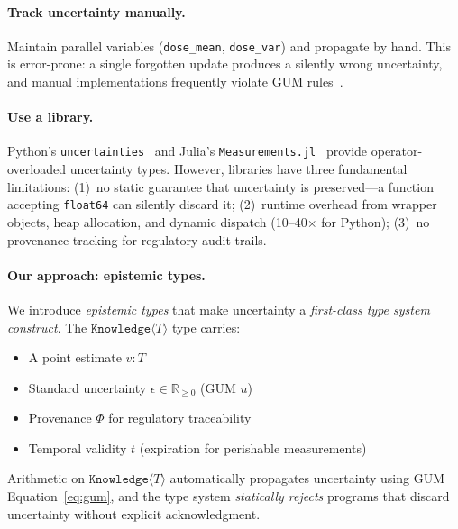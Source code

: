 \documentclass[acmsmall,screen,review,anonymous]{acmart}
\newcommand{\know}[1]{\texttt{Knowledge}\langle #1 \rangle}
\begin{document}
\paragraph{Track uncertainty manually.}
Maintain parallel variables (\texttt{dose\_mean}, \texttt{dose\_var})
and propagate by hand.
This is error-prone: a single forgotten update produces a silently
wrong uncertainty, and manual implementations frequently violate
GUM rules~\cite{jcgm2008supplement1}.

\paragraph{Use a library.}
Python's \texttt{uncertainties}~\cite{lebigot2024uncertainties} and
Julia's \texttt{Measurements.jl}~\cite{giordano2016measurements} provide
operator-overloaded uncertainty types.
However, libraries have three fundamental limitations:
(1)~no static guarantee that uncertainty is preserved---a function
accepting \texttt{float64} can silently discard it;
(2)~runtime overhead from wrapper objects, heap allocation, and
dynamic dispatch (10--40$\times$ for Python);
(3)~no provenance tracking for regulatory audit trails.

\paragraph{Our approach: epistemic types.}
We introduce \emph{epistemic types} that make uncertainty a
\emph{first-class type system construct}.
The $\know{T}$ type carries:
\begin{itemize}
  \item A point estimate $v : T$
  \item Standard uncertainty $\epsilon \in \mathbb{R}_{\geq 0}$ (GUM $u$)
  \item Provenance $\Phi$ for regulatory traceability
  \item Temporal validity $t$ (expiration for perishable measurements)
\end{itemize}

Arithmetic on $\know{T}$ automatically propagates uncertainty
using GUM Equation~\eqref{eq:gum}, and the type system \emph{statically
rejects} programs that discard uncertainty without explicit acknowledgment.
\end{document}

